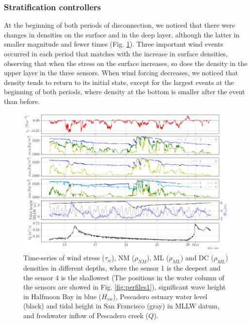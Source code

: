 \documentclass[tesis.tex]{subfiles}
\begin{document}
\subsubsection{Stratification controllers}

At the beginning of both periods of disconnection, we noticed that there were changes in densities on the surface and in the deep layer, although the latter in smaller magnitude and fewer times (Fig. \ref{fig:dens}). Three important wind events occurred in each period that matches with the increase in surface densities, observing that when the stress on the surface increases, so does the density in the upper layer in the three sensors. When wind forcing decreases, we noticed that density tends to return to its initial state, except for the largest events at the beginning of both periods, where density at the bottom is smaller after the event than before.\\

\begin{figure}[h!]
    \centering
    \includegraphics[width=\textwidth]{Imagenes/dens.png}
    \caption{Time-series of wind stress ($\tau_w$), NM ($\rho_{NM}$), ML ($\rho_{ML}$) and DC ($\rho_{ML}$) densities in different depths, where the sensor 1 is the deepest and the sensor 4 is the shallowest (The positions in the water column of the sensors are showed in Fig. \ref{fig:perfiles1}), significant wave height in Halfmoon Bay in blue ($H_{sw}$), Pescadero estuary water level (black) and tidal height in San Francisco (gray) in MLLW datum, and freshwater inflow of Pescadero creek ($Q$).}
    \label{fig:dens}
\end{figure}
\end{document}
